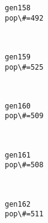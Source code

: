 \documentclass[11pt]{article}
\begin{document}
    \begin{Verbatim}[commandchars=\\\{\}]
gen158
pop\#=492

    \end{Verbatim}

    \begin{center}
    \end{center}
    { \hspace*{\fill} \\}
    
    \begin{Verbatim}[commandchars=\\\{\}]
gen159
pop\#=525

    \end{Verbatim}

    \begin{center}
    \end{center}
    { \hspace*{\fill} \\}
    
    \begin{Verbatim}[commandchars=\\\{\}]
gen160
pop\#=509

    \end{Verbatim}

    \begin{center}
    \end{center}
    { \hspace*{\fill} \\}
    
    \begin{Verbatim}[commandchars=\\\{\}]
gen161
pop\#=508

    \end{Verbatim}

    \begin{center}
    \end{center}
    { \hspace*{\fill} \\}
    
    \begin{Verbatim}[commandchars=\\\{\}]
gen162
pop\#=511

    \end{Verbatim}
\end{document}
